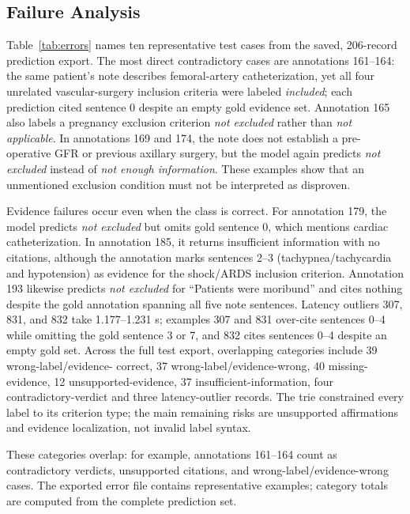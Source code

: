 \documentclass[conference]{IEEEtran}
\begin{document}
\subsection{Failure Analysis}
Table~\ref{tab:errors} names ten representative test cases from the saved, 206-record
prediction export. The most direct contradictory cases are annotations 161--164: the
same patient's note describes femoral-artery catheterization, yet all four unrelated
vascular-surgery inclusion criteria were labeled \emph{included}; each prediction cited
sentence 0 despite an empty gold evidence set. Annotation 165 also labels a pregnancy
exclusion criterion \emph{not excluded} rather than \emph{not applicable}. In
annotations 169 and 174, the note does not establish a pre-operative GFR or previous
axillary surgery, but the model again predicts \emph{not excluded} instead of
\emph{not enough information}. These examples show that an unmentioned exclusion
condition must not be interpreted as disproven.

Evidence failures occur even when the class is correct. For annotation 179, the model
predicts \emph{not excluded} but omits gold sentence 0, which mentions cardiac
catheterization. In annotation 185, it returns insufficient information with no
citations, although the annotation marks sentences 2--3 (tachypnea/tachycardia and
hypotension) as evidence for the shock/ARDS inclusion criterion. Annotation 193 likewise
predicts \emph{not excluded} for ``Patients were moribund'' and cites nothing despite
the gold annotation spanning all five note sentences. Latency outliers 307, 831, and
832 take 1.177--1.231 s; examples 307 and 831 over-cite sentences 0--4 while omitting
the gold sentence 3 or 7, and 832 cites sentences 0--4 despite an empty gold set.
Across the full test export, overlapping categories include 39 wrong-label/evidence-
correct, 37 wrong-label/evidence-wrong, 40 missing-evidence, 12 unsupported-evidence,
37 insufficient-information, four contradictory-verdict and three latency-outlier
records. The trie constrained every label to its criterion type; the main remaining
risks are unsupported affirmations and evidence localization, not invalid label syntax.

These categories overlap: for example, annotations 161--164 count as contradictory
verdicts, unsupported citations, and wrong-label/evidence-wrong cases. The exported
error file contains representative examples; category totals are computed from the
complete prediction set.
\end{document}
